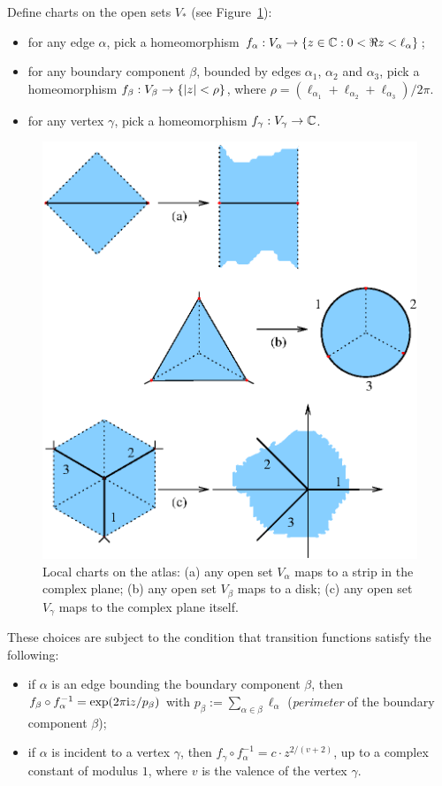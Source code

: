 Define charts on the open sets $V_*$ (see Figure~\ref{fig:charts}):
\begin{itemize}
\item for any edge $\alpha$, pick a homeomorphism $f_\alpha: V_\alpha \to \{ z \in \mathbb{C}
  : 0 < \Re z < \ell_\alpha \}$;
\item for any boundary component $\beta$, bounded by edges $\alpha_1$, $\alpha_2$
  and $\alpha_3$, pick a homeomorphism $f_\beta: V_\beta \to \{ \lvert z\rvert < \rho \}$, where
  $\rho = (\ell_{\alpha_1} + \ell_{\alpha_2} + \ell_{\alpha_3}) / 2\pi$.
\item for any vertex $\gamma$, pick a homeomorphism $f_\gamma: V_\gamma \to \mathbb{C}$.
\end{itemize}
\begin{figure}[htbp]
  \centering\includegraphics{charts}
  \caption{Local charts on the atlas: (a) any open set $V_\alpha$
    maps to a strip in the complex plane; (b) any open set $V_\beta$
    maps to a disk; (c) any open set $V_\gamma$ maps to the complex
    plane itself.}
  \label{fig:charts}
\end{figure}
These choices are subject to the condition that transition functions
satisfy the following:
\begin{itemize}
\item if $\alpha$ is an edge bounding the boundary component $\beta$, then $f_\beta
  \circ f_\alpha^{-1} = \exp (2\pi\mathrm{i} z / p_\beta)$ with $p_\beta := \sum_{\alpha \in \beta} \ell_\alpha$
  (\emph{perimeter} of the boundary component $\beta$);
\item if $\alpha$ is incident to a vertex $\gamma$, then $f_\gamma \circ f_\alpha^{-1} =
  c \cdot z^{2/(v+2)}$, up to a complex constant of modulus $1$, where
  $v$ is the valence of the vertex $\gamma$.
\end{itemize}

